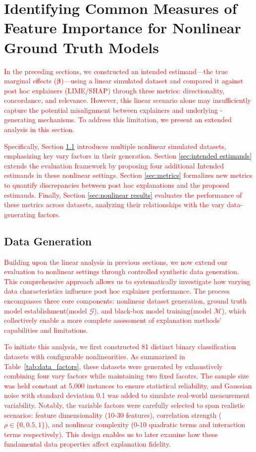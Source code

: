 \section{Identifying Common Measures of Feature Importance for Nonlinear Ground Truth Models}
\label{sec:general_case}
\textcolor{red}{In the preceding sections, we constructed an intended estimand—the true marginal effects ($\boldsymbol{\beta}$)—using a linear simulated dataset and compared it against post hoc explainers (LIME/SHAP) through three metrics: directionality, concordance, and relevance. However, this linear scenario alone may insufficiently capture the potential misalignment between explainers and underlying -generating mechanisms. To address this limitation, we present an extended analysis in this section.}

\textcolor{red}{Specifically, Section \ref{sec:nonlinear data generation} introduces multiple nonlinear simulated datasets, emphasizing key vary factors in their generation. Section \ref{sec:intended estimands} extends the evaluation framework by proposing four additional Intended estimands in these nonlinear settings. Section \ref{sec:metrics} formalizes new metrics to quantify discrepancies between post hoc explanations and the proposed estimands. Finally, Section \ref{sec:nonlinear results} evaluates the performance of these metrics across datasets, analyzing their relationships with the vary data-generating factors.}

\subsection{Data Generation}
    \label{sec:nonlinear data generation}
\textcolor{red}{Building upon the linear analysis in previous sections, we now extend our evaluation to nonlinear settings through controlled synthetic data generation. This comprehensive approach allows us to systematically investigate how varying data characteristics influence post hoc explainer performance. The process encompasses three core components: nonlinear dataset generation, ground truth model establishment(model $\mathcal{G}$), and black-box model training(model $\mathcal{M}$), which collectively enable a more complete assessment of explanation methods' capabilities and limitations.}

\textcolor{red}{To initiate this analysis, we first constructed 81 distinct binary classification datasets with configurable nonlinearities. As summarized in Table~\ref{tab:data_factors}, these datasets were generated by exhaustively combining four vary factors while maintaining two fixed facotrs. The sample size was held constant at 5,000 instances to ensure statistical reliability, and Gaussian noise with standard deviation 0.1 was added to simulate real-world measurement variability. Notably, the variable factors were carefully selected to span realistic scenarios: feature dimensionality (10-30 features), correlation strength ($\rho \in \{0, 0.5, 1\}$), and nonlinear complexity (0-10 quadratic terms and interaction terms respectively). This design enables us to later examine how these fundamental data properties affect explanation fidelity.}

